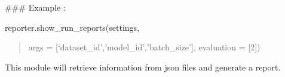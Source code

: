 \documentclass[letterpaper,10pt,english]{sphinxmanual}
\begin{document}
\sphinxAtStartPar
\#\#\# Example :

\sphinxAtStartPar
{\color{red}\bfseries{}\textasciigrave{}\textasciigrave{}}\textasciigrave{}
reporter.show\_run\_reports(settings,
\begin{quote}

\sphinxAtStartPar
args   = {[}‘dataset\_id’,’model\_id’,’batch\_size’{]},
evaluation = {[}2{]})
\end{quote}

\sphinxAtStartPar
{\color{red}\bfseries{}\textasciigrave{}\textasciigrave{}}{\color{red}\bfseries{}\textasciigrave{}}

\sphinxAtStartPar
This module will retrieve information from json files and generate a report.
\end{document}
